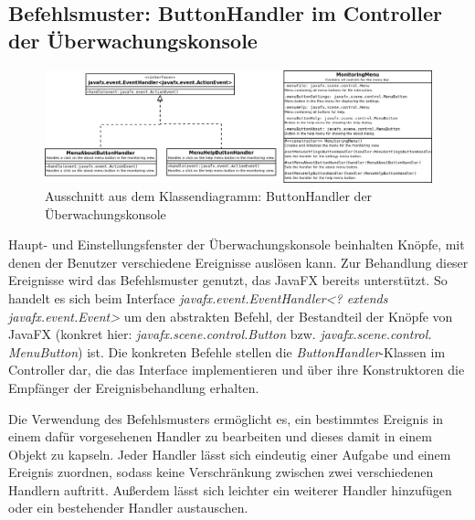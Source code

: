 \documentclass[parskip=full]{scrartcl}
\begin{document}
\pagebreak
\subsection{Befehlsmuster: ButtonHandler im Controller der Überwachungskonsole}
\begin{figure}[H]
  \centering
  \includegraphics[scale=0.33]{design/pattern-screenshots/command-ButtonHandler.png}
  \caption{Ausschnitt aus dem Klassendiagramm: ButtonHandler der Überwachungskonsole}
\end{figure}
Haupt- und Einstellungsfenster der Überwachungskonsole beinhalten Knöpfe, mit denen der Benutzer verschiedene
Ereignisse auslösen kann. Zur Behandlung dieser Ereignisse wird das Befehlsmuster genutzt, das JavaFX bereits
unterstützt. So handelt es sich beim Interface \emph{javafx.event.EventHandler<? extends javafx.event.Event>}
um den abstrakten Befehl, der Bestandteil der Knöpfe von JavaFX (konkret hier: \emph{javafx.scene.control.Button} bzw. 
\emph{javafx.scene.control.\\MenuButton}) ist. Die konkreten Befehle stellen die \emph{ButtonHandler}-Klassen
im Controller dar, die das Interface implementieren und über ihre Konstruktoren die Empfänger der
Ereignisbehandlung erhalten.

Die Verwendung des Befehlsmusters ermöglicht es, ein bestimmtes Ereignis in einem dafür vorgesehenen Handler
zu bearbeiten und dieses damit in einem Objekt zu kapseln. Jeder Handler lässt sich eindeutig einer Aufgabe
und einem Ereignis zuordnen, sodass keine Verschränkung zwischen zwei verschiedenen Handlern auftritt.
Außerdem lässt sich leichter ein weiterer Handler hinzufügen oder ein bestehender Handler austauschen.

\pagebreak
\end{document}
